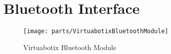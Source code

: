 \chapter{Bluetooth Interface}
\begin{figure}[h]
  \texttt{[image: parts/VirtuabotixBluetoothModule]}
  \centering
  \caption{Virtuabotix Bluetooth Module}
  \label{fig:bluetooth_module}
\end{figure}

